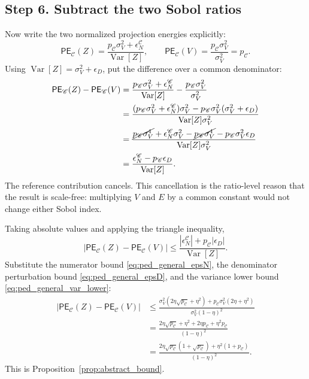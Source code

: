 \documentclass[11pt,letterpaper]{article}
\DeclareMathOperator{\Var}{Var}
\theoremstyle{remark}
\begin{document}
\subsection*{Step 6. Subtract the two Sobol ratios}

Now write the two normalized projection energies explicitly:
\begin{equation}
  \mathsf{PE}_{\mathscr C}(Z)
  =\frac{p_{\mathscr C}\sigma_V^2+
  \epsilon_N^{\mathscr C}}{\Var[Z]},
  \qquad
  \mathsf{PE}_{\mathscr C}(V)
  =\frac{p_{\mathscr C}\sigma_V^2}{\sigma_V^2}
  =p_{\mathscr C}.
\end{equation}
Using $\Var[Z]=\sigma_V^2+
\epsilon_D$, put the difference over a common denominator:
\begin{align}
  \mathsf{PE}_{\mathscr C}(Z)-\mathsf{PE}_{\mathscr C}(V)
  &=\frac{p_{\mathscr C}\sigma_V^2+
      \epsilon_N^{\mathscr C}}{\Var[Z]}
    -\frac{p_{\mathscr C}\sigma_V^2}{\sigma_V^2} \\
  &=\frac{(p_{\mathscr C}\sigma_V^2+
      \epsilon_N^{\mathscr C})\sigma_V^2
      -p_{\mathscr C}\sigma_V^2(\sigma_V^2+
      \epsilon_D)}{\Var[Z]\sigma_V^2} \\
  &=\frac{\cancel{p_{\mathscr C}\sigma_V^4}
      +\epsilon_N^{\mathscr C}\sigma_V^2
      -\cancel{p_{\mathscr C}\sigma_V^4}
      -p_{\mathscr C}\sigma_V^2\epsilon_D}{\Var[Z]\sigma_V^2} \\
  &=\frac{\epsilon_N^{\mathscr C}
      -p_{\mathscr C}\epsilon_D}{\Var[Z]}.
  \label{eq:ped_general_ratio}
\end{align}
The reference contribution cancels. This cancellation is the ratio-level reason
that the result is scale-free: multiplying $V$ and $E$ by a common constant would
not change either Sobol index.

Taking absolute values and applying the triangle inequality,
\begin{equation}
  \left|\mathsf{PE}_{\mathscr C}(Z)-\mathsf{PE}_{\mathscr C}(V)\right|
  \leq
  \frac{|\epsilon_N^{\mathscr C}|+p_{\mathscr C}|\epsilon_D|}{\Var[Z]}.
\end{equation}
Substitute the numerator bound \eqref{eq:ped_general_epsN}, the denominator
perturbation bound \eqref{eq:ped_general_epsD}, and the variance lower bound
\eqref{eq:ped_general_var_lower}:
\begin{align}
  \left|\mathsf{PE}_{\mathscr C}(Z)-\mathsf{PE}_{\mathscr C}(V)\right|
  &\leq
  \frac{
    \sigma_V^2(2\eta\sqrt{p_{\mathscr C}}+
    \eta^2)
    +p_{\mathscr C}\sigma_V^2(2\eta+
    \eta^2)
  }{\sigma_V^2(1-\eta)^2} \\
  &=
  \frac{
    2\eta\sqrt{p_{\mathscr C}}+
    \eta^2+2\eta p_{\mathscr C}+
    \eta^2p_{\mathscr C}
  }{(1-\eta)^2} \\
  &=
  \frac{
    2\eta\sqrt{p_{\mathscr C}}(1+\sqrt{p_{\mathscr C}})
    +\eta^2(1+p_{\mathscr C})
  }{(1-\eta)^2}.
\end{align}
This is Proposition~\ref{prop:abstract_bound}.
\end{document}
